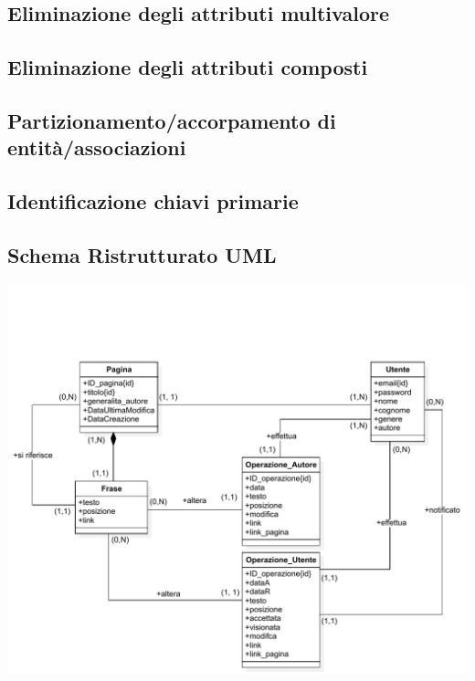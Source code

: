 \documentclass{article}
\begin{document}
\subsection{Eliminazione degli attributi multivalore}


\subsection{Eliminazione degli attributi composti}


\subsection{Partizionamento/accorpamento di entità/associazioni}

\subsection{Identificazione chiavi primarie}


\subsection{Schema Ristrutturato UML}
\includegraphics[width=1\textwidth]{Capitoli/Ristrutturazione/UML_Ristrutturato.pdf}
\end{document}

